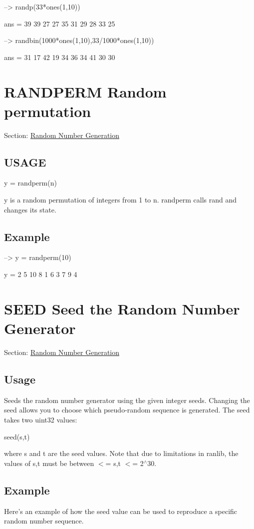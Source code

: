 \begin{DoxyVerbInclude}
--> randp(33*ones(1,10))

ans = 
 39 39 27 27 35 31 29 28 33 25 

--> randbin(1000*ones(1,10),33/1000*ones(1,10))

ans = 
 31 17 42 19 34 36 34 41 30 30 
\end{DoxyVerbInclude}
 \hypertarget{random_randperm}{}\section{R\-A\-N\-D\-P\-E\-R\-M Random permutation}\label{random_randperm}
Section\-: \hyperlink{sec_random}{Random Number Generation} \hypertarget{typecast_dec2bin_USAGE}{}\subsection{U\-S\-A\-G\-E}\label{typecast_dec2bin_USAGE}
\begin{DoxyVerb}   y = randperm(n)
\end{DoxyVerb}
 {\ttfamily y} is a random permutation of integers from 1 to {\ttfamily n}. {\ttfamily randperm} calls {\ttfamily rand} and changes its state. \hypertarget{variables_struct_Example}{}\subsection{Example}\label{variables_struct_Example}

\begin{DoxyVerbInclude}
--> y = randperm(10)

y = 
  2  5 10  8  1  6  3  7  9  4 
\end{DoxyVerbInclude}
 \hypertarget{random_seed}{}\section{S\-E\-E\-D Seed the Random Number Generator}\label{random_seed}
Section\-: \hyperlink{sec_random}{Random Number Generation} \hypertarget{vtkwidgets_vtkxyplotwidget_Usage}{}\subsection{Usage}\label{vtkwidgets_vtkxyplotwidget_Usage}
Seeds the random number generator using the given integer seeds. Changing the seed allows you to choose which pseudo-\/random sequence is generated. The seed takes two {\ttfamily uint32} values\-: \begin{DoxyVerb}  seed(s,t)
\end{DoxyVerb}
 where {\ttfamily s} and {\ttfamily t} are the seed values. Note that due to limitations in {\ttfamily ranlib}, the values of {\ttfamily s,t} must be between { $<$= s,t $<$= 2$^\wedge$30}. \hypertarget{variables_struct_Example}{}\subsection{Example}\label{variables_struct_Example}
Here's an example of how the seed value can be used to reproduce a specific random number sequence.


